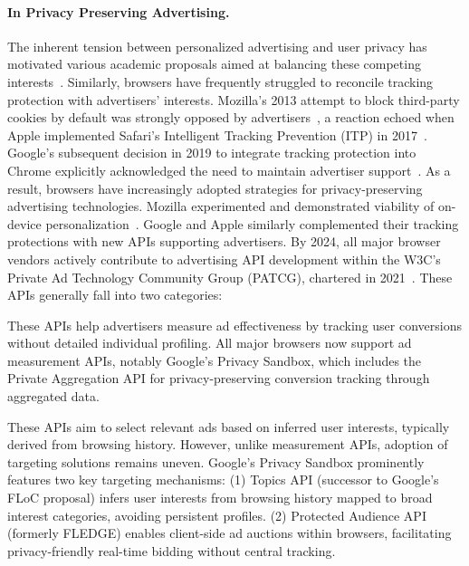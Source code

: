 \paragraph{In Privacy Preserving Advertising.}
%
The inherent tension between personalized advertising and user privacy has motivated various academic proposals aimed at balancing these competing interests~\cite{toubianaAdnosticPrivacyPreserving2010,guhaPrivadPracticalPrivacy2011,backesObliviAdProvablySecure2012}. Similarly, browsers have frequently struggled to reconcile tracking protection with advertisers' interests. Mozilla’s 2013 attempt to block third-party cookies by default was strongly opposed by advertisers~\cite{ribeiroMozillaPostponesDefault2013}, a reaction echoed when Apple implemented Safari's Intelligent Tracking Prevention (ITP) in 2017~\cite{stattAdvertisersAreFurious2017}. Google's subsequent decision in 2019 to integrate tracking protection into Chrome explicitly acknowledged the need to maintain advertiser support~\cite{schuhBuildingMorePrivate2019,chromeBuildingMorePrivate2020}.
%
As a result, browsers have increasingly adopted strategies for privacy-preserving advertising technologies. Mozilla experimented and demonstrated viability of on-device personalization~\cite{mozillaProvidingValuablePlatform2015}. Google and Apple similarly complemented their tracking protections with new APIs supporting advertisers. By 2024, all major browser vendors actively contribute to advertising API development within the W3C’s Private Ad Technology Community Group (PATCG), chartered in 2021~\cite{hercherW3CAdPrivacy2022}. These APIs generally fall into two categories:

 These APIs help advertisers measure ad effectiveness by tracking user conversions without detailed individual profiling. All major browsers now support ad measurement APIs, notably Google's Privacy Sandbox, which includes the Private Aggregation API for privacy-preserving conversion tracking through aggregated data.

 These APIs aim to select relevant ads based on inferred user interests, typically derived from browsing history. However, unlike measurement APIs, adoption of targeting solutions remains uneven. Google's Privacy Sandbox prominently features two key targeting mechanisms: (1) Topics API (successor to Google's FLoC proposal) infers user interests from browsing history mapped to broad interest categories, avoiding persistent profiles. (2) Protected Audience API (formerly FLEDGE) enables client-side ad auctions within browsers, facilitating privacy-friendly real-time bidding without central tracking.


